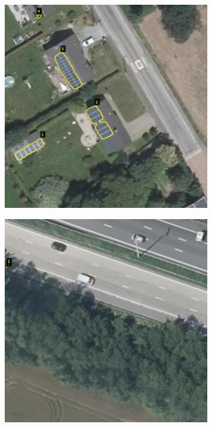 \documentclass[a4paper, 12pt]{article}
\begin{document}
\begin{figure}[h]
\begin{subfigure}{0.31\textwidth}
		\vspace{0em}
	\end{subfigure}
	\hspace{0.5em}
	\begin{subfigure}{0.31\textwidth}
		\centering
		\includegraphics[width=\textwidth]{resources/jpg/609525_533266.jpg}
		\vspace{0em}
	\end{subfigure}
	\begin{subfigure}{0.31\textwidth}
		\centering
		\includegraphics[width=\textwidth]{resources/jpg/609293_532938.jpg}

\end{subfigure}
\end{figure}
\end{document}
